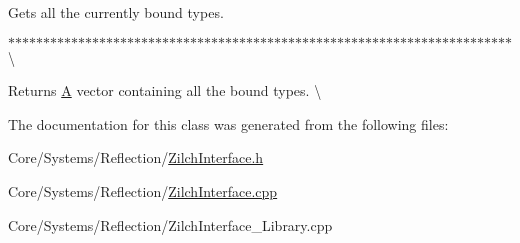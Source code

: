 Gets all the currently bound types. 

$\ast$$\ast$$\ast$$\ast$$\ast$$\ast$$\ast$$\ast$$\ast$$\ast$$\ast$$\ast$$\ast$$\ast$$\ast$$\ast$$\ast$$\ast$$\ast$$\ast$$\ast$$\ast$$\ast$$\ast$$\ast$$\ast$$\ast$$\ast$$\ast$$\ast$$\ast$$\ast$$\ast$$\ast$$\ast$$\ast$$\ast$$\ast$$\ast$$\ast$$\ast$$\ast$$\ast$$\ast$$\ast$$\ast$$\ast$$\ast$$\ast$$\ast$$\ast$$\ast$$\ast$$\ast$$\ast$$\ast$$\ast$$\ast$$\ast$$\ast$$\ast$$\ast$$\ast$$\ast$$\ast$$\ast$$\ast$$\ast$$\ast$$\ast$$\ast$$\ast$\textbackslash{} \begin{DoxyReturn}{Returns}
\hyperlink{classA}{A} vector containing all the bound types. \textbackslash{} 
\end{DoxyReturn}


The documentation for this class was generated from the following files\-:\begin{DoxyCompactItemize}
\item 
Core/\-Systems/\-Reflection/\hyperlink{ZilchInterface_8h}{Zilch\-Interface.\-h}\item 
Core/\-Systems/\-Reflection/\hyperlink{ZilchInterface_8cpp}{Zilch\-Interface.\-cpp}\item 
Core/\-Systems/\-Reflection/Zilch\-Interface\-\_\-\-Library.\-cpp\end{DoxyCompactItemize}
